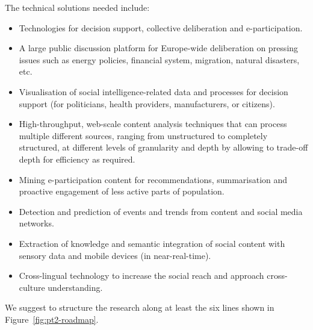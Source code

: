\documentclass[10pt, plain]{../../metanetpaper}
\begin{document}
\begin{multicols}{2}
The technical solutions needed include:

\begin{itemize}
\item Technologies for decision support, collective deliberation and e-participation.
\item A large public discussion platform for Europe-wide deliberation on pressing issues such as energy policies, financial system, migration, natural disasters, etc.
\item Visualisation of social intelligence-related data and processes for decision support (for politicians, health providers, manufacturers, or citizens).
\item High-throughput, web-scale content analysis techniques that can process multiple different sources, ranging from unstructured to completely structured, at different levels of granularity and depth by allowing to trade-off depth for efficiency as required.
\item Mining e-participation content for recommendations, summarisation and proactive engagement of less active parts of population.
\item Detection and prediction of events and trends from content and social media networks.
\item Extraction of knowledge and semantic integration of social content with sensory data and mobile devices (in near-real-time).
\item Cross-lingual technology to increase the social reach and approach cross-culture understanding.
\end{itemize}

We suggest to structure the research along at least the six lines shown in Figure~\ref{fig:pt2-roadmap}.


\end{multicols}
\end{document}
